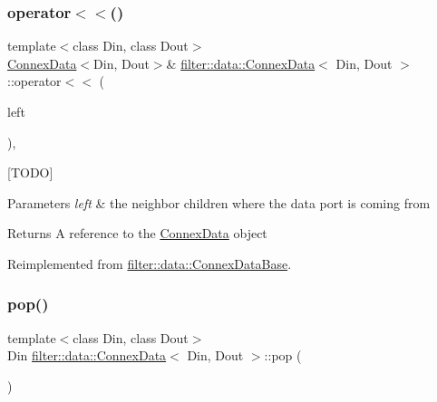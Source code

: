 \subsubsection{\texorpdfstring{operator$<$$<$()}{operator<<()}\hspace{0.1cm}{\footnotesize\ttfamily [2/2]}}
{\footnotesize\ttfamily template$<$class Din, class Dout$>$ \\
\hyperlink{classfilter_1_1data_1_1_connex_data}{Connex\+Data}$<$Din, Dout$>$\& \hyperlink{classfilter_1_1data_1_1_connex_data}{filter\+::data\+::\+Connex\+Data}$<$ Din, Dout $>$\+::operator$<$$<$ (\begin{DoxyParamCaption}\item[{\hyperlink{classfilter_1_1data_1_1_connex_data_base}{Connex\+Data\+Base} \&}]{left }\end{DoxyParamCaption})\hspace{0.3cm}{\ttfamily [inline]}, {\ttfamily [virtual]}}

\mbox{[}T\+O\+DO\mbox{]} 
\begin{DoxyParams}{Parameters}
{\em left} & the neighbor children where the data port is coming from \\
\hline
\end{DoxyParams}
\begin{DoxyReturn}{Returns}
A reference to the \hyperlink{classfilter_1_1data_1_1_connex_data}{Connex\+Data} object 
\end{DoxyReturn}


Reimplemented from \hyperlink{classfilter_1_1data_1_1_connex_data_base_a6d7080cbc59391a6c79ddc12442d6b62}{filter\+::data\+::\+Connex\+Data\+Base}.

\mbox{\label{classfilter_1_1data_1_1_connex_data_a4367cfe424cefb90470098814a33e326}} 
\subsubsection{\texorpdfstring{pop()}{pop()}}
{\footnotesize\ttfamily template$<$class Din, class Dout$>$ \\
Din \hyperlink{classfilter_1_1data_1_1_connex_data}{filter\+::data\+::\+Connex\+Data}$<$ Din, Dout $>$\+::pop (\begin{DoxyParamCaption}{ }\end{DoxyParamCaption})\hspace{0.3cm}{\ttfamily [inline]}}

